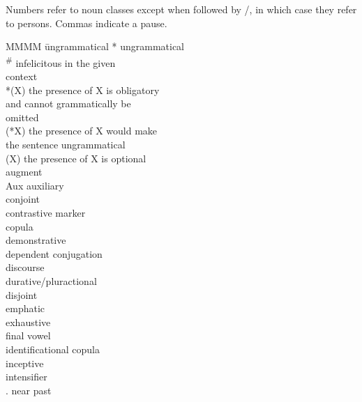 \documentclass[output=paper]{langscibook}
\begin{document}
Numbers refer to noun classes except when followed by \SG{}/\PL{}, in which case they refer to persons. Commas indicate a pause.

\begin{multicols}{2}
\begin{tabbing}
MMMM \= ungrammatical\kill
* \> ungrammatical\\
\textsuperscript{\#} \> infelicitous in the given \\ \> context\\
*(X) \> the presence of X is obligatory \\ \>  and cannot grammatically be  \\ \>  omitted\\
(*X) \> the presence of X would make \\ \>  the sentence ungrammatical\\
(X) \> the presence of X is optional\\
\AUG{} \> augment\\
Aux \> auxiliary\\
\CJ{} \> conjoint\\
\CM{} \> contrastive marker\\
\COP{} \> copula\\
\DEM{} \> demonstrative\\
\DEP{} \> dependent conjugation\\
\DISC{} \> discourse\\
\DUR{} \> durative/pluractional\\
\DJ{} \> disjoint\\
\EMPH{} \> emphatic \\
\EXH{} \> exhaustive\\
\FV{} \> final vowel\\
\IDCOP{} \> identificational copula\\
\INCP{} \> inceptive\\
\INT{} \> intensifier\\
\N.\PST{} \> near past\\

\end{tabbing}
\end{multicols}
\end{document}
